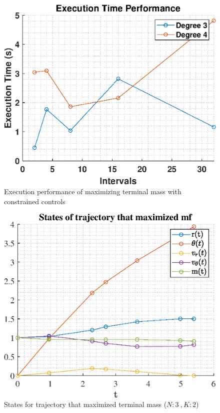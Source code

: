 \documentclass[]{article}
\begin{document}
	\begin{figure}
		\centering
		\includegraphics[scale=0.75]{runtime_c3_mf.eps}
		\caption{Execution performance of maximizing terminal mass with constrained controls}
		\label{fig:runtime_c3_mf}
	\end{figure}
	\FloatBarrier
	\begin{figure}
		\centering
		\includegraphics[scale=0.75]{states_N3_K2_C3_mf.eps}
		\caption{States for trajectory that maximized terminal mass (\(N:3\ , K:2\))}
		\label{fig:states_N3_K2_C3_mf}
	\end{figure}
\end{document}
